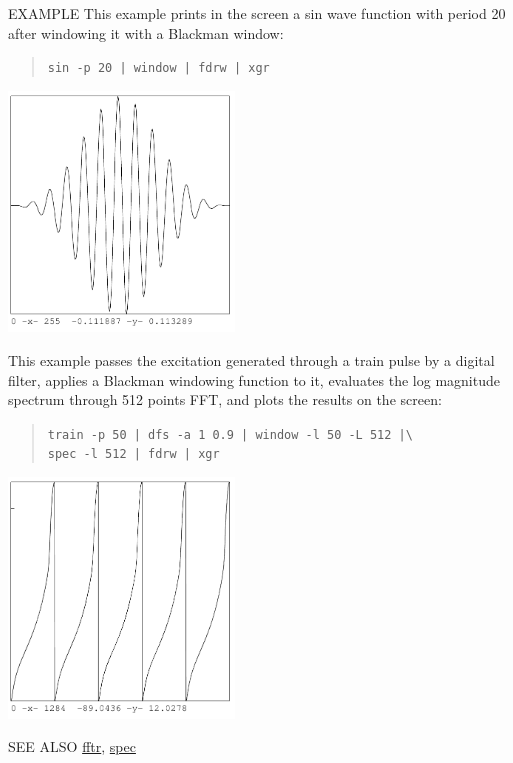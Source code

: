 \begin{qsection}{EXAMPLE}
This example prints in the screen a sin wave function
with period 20 after windowing it with a Blackman window:
\begin{quote}
  \verb!sin -p 20 | window | fdrw | xgr !
\end{quote}
\begin{center}
\includegraphics[width=6cm]{fig/window_1.pdf}
\end{center}
\par
This example passes the excitation generated through a train pulse
by a digital filter, applies a Blackman windowing function to it,
evaluates the log magnitude spectrum through 512 points FFT,
and plots the results on the screen:
\begin{quote}
\verb!train -p 50 | dfs -a 1 0.9 | window -l 50 -L 512 |\! \\
\verb!spec -l 512 | fdrw | xgr!
\end{quote}
\begin{center}
\includegraphics[width=6cm]{fig/window_2.pdf}
\end{center}
\end{qsection}

\begin{qsection}{SEE ALSO}
\hyperlink{fftr}{fftr},
\hyperlink{spec}{spec}
\end{qsection}
